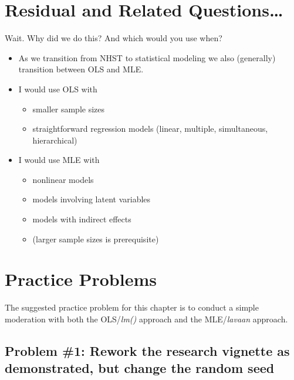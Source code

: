 \documentclass[
  english,
]{book}
\providecommand{\tightlist}{%
  \setlength{\itemsep}{0pt}\setlength{\parskip}{0pt}}
\begin{document}
\hypertarget{residual-and-related-questions-2}{%
\section{Residual and Related Questions\ldots{}}\label{residual-and-related-questions-2}}

Wait. Why did we do this? And which would you use when?

\begin{itemize}
\tightlist
\item
  As we transition from NHST to statistical modeling we also (generally) transition between OLS and MLE.
\item
  I would use OLS with

  \begin{itemize}
  \tightlist
  \item
    smaller sample sizes
  \item
    straightforward regression models (linear, multiple, simultaneous, hierarchical)
  \end{itemize}
\item
  I would use MLE with

  \begin{itemize}
  \tightlist
  \item
    nonlinear models
  \item
    models involving latent variables
  \item
    models with indirect effects
  \item
    (larger sample sizes is prerequisite)
  \end{itemize}
\end{itemize}

\hypertarget{practice-problems-7}{%
\section{Practice Problems}\label{practice-problems-7}}

The suggested practice problem for this chapter is to conduct a simple moderation with both the OLS/\emph{lm()} approach and the MLE/\emph{lavaan} approach.

\hypertarget{problem-1-rework-the-research-vignette-as-demonstrated-but-change-the-random-seed-3}{%
\subsection{Problem \#1: Rework the research vignette as demonstrated, but change the random seed}\label{problem-1-rework-the-research-vignette-as-demonstrated-but-change-the-random-seed-3}}
\end{document}
